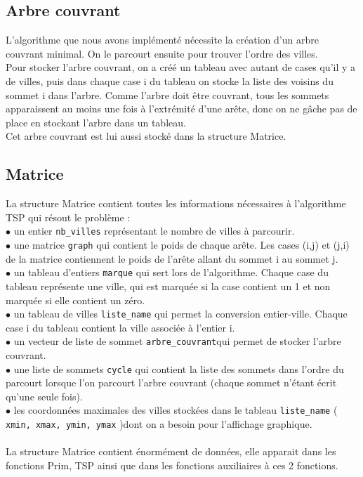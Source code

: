 \documentclass[a4paper,11pt]{article}
\begin{document}
\subsection{Arbre couvrant}

L'algorithme que nous avons implémenté nécessite la création d'un arbre couvrant minimal. On le parcourt ensuite pour trouver l'ordre des villes.\\
Pour stocker l'arbre couvrant, on a créé un tableau avec autant de cases qu'il y a de villes, puis dans chaque case i du tableau on stocke la liste des voisins du sommet i dans l'arbre. Comme l'arbre doit être couvrant, tous les sommets apparaissent au moins une fois à l'extrémité d'une arête, donc on ne gâche pas de place en stockant l'arbre dans un tableau.\\
Cet arbre couvrant est lui aussi stocké dans la structure Matrice.\\

\subsection{Matrice} %

La structure Matrice contient toutes les informations nécessaires à l'algorithme TSP qui résout le problème :\\
$\bullet$ un entier \texttt{nb\_villes} représentant le nombre de villes à parcourir.\\
$\bullet$ une matrice \texttt{graph} qui contient le poids de chaque arête. Les cases (i,j) et (j,i) de la matrice contiennent le poids de l'arête allant du sommet i au sommet j.\\
$\bullet$ un tableau d'entiers \texttt{marque} qui sert lors de l'algorithme. Chaque case du tableau représente une ville, qui est marquée si la case contient un 1 et non marquée si elle contient un zéro.\\
$\bullet$ un tableau de villes \texttt{liste\_name} qui permet la conversion entier-ville. Chaque case i du tableau contient la ville associée à l'entier i.\\
$\bullet$ un vecteur de liste de sommet \texttt{arbre\_couvrant}qui permet de stocker l'arbre couvrant.\\
$\bullet$ une liste de sommets \texttt{cycle} qui contient la liste des sommets dans l'ordre du parcourt lorsque l'on parcourt l'arbre couvrant (chaque sommet n'étant écrit qu'une seule fois).\\
$\bullet$ les coordonnées maximales des villes stockées dans le tableau \texttt{liste\_name} ( \texttt{xmin, xmax, ymin, ymax} )dont on a besoin pour l'affichage graphique.\\
\\
La structure Matrice contient énormément de données, elle apparait dans les fonctions Prim, TSP ainsi que dans les fonctions auxiliaires à ces 2 fonctions.\\
\end{document}
